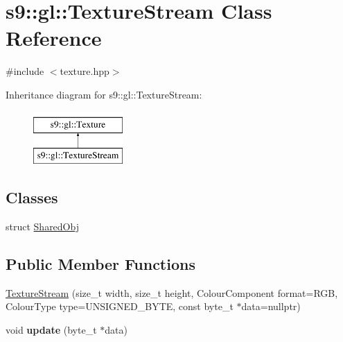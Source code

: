 \hypertarget{classs9_1_1gl_1_1TextureStream}{\section{s9\-:\-:gl\-:\-:\-Texture\-Stream \-Class \-Reference}
\label{classs9_1_1gl_1_1TextureStream}
}


{\ttfamily \#include $<$texture.\-hpp$>$}

\-Inheritance diagram for s9\-:\-:gl\-:\-:\-Texture\-Stream\-:\begin{figure}[H]
\begin{center}
\leavevmode
\includegraphics[height=2.000000cm]{classs9_1_1gl_1_1TextureStream}
\end{center}
\end{figure}
\subsection*{\-Classes}
\begin{DoxyCompactItemize}
\item 
struct \hyperlink{structs9_1_1gl_1_1TextureStream_1_1SharedObj}{\-Shared\-Obj}
\end{DoxyCompactItemize}
\subsection*{\-Public \-Member \-Functions}
\begin{DoxyCompactItemize}
\item 
\hyperlink{classs9_1_1gl_1_1TextureStream_af480e3b1df190227d46215955824dcc0}{\-Texture\-Stream} (size\-\_\-t width, size\-\_\-t height, \-Colour\-Component format=\-R\-G\-B, \-Colour\-Type type=\-U\-N\-S\-I\-G\-N\-E\-D\-\_\-\-B\-Y\-T\-E, const byte\-\_\-t $\ast$data=nullptr)
\item 
\hypertarget{classs9_1_1gl_1_1TextureStream_a7c4d18a5491e828be0ba1dcab9b77327}{void {\bfseries update} (byte\-\_\-t $\ast$data)}\label{classs9_1_1gl_1_1TextureStream_a7c4d18a5491e828be0ba1dcab9b77327}

\end{DoxyCompactItemize}

